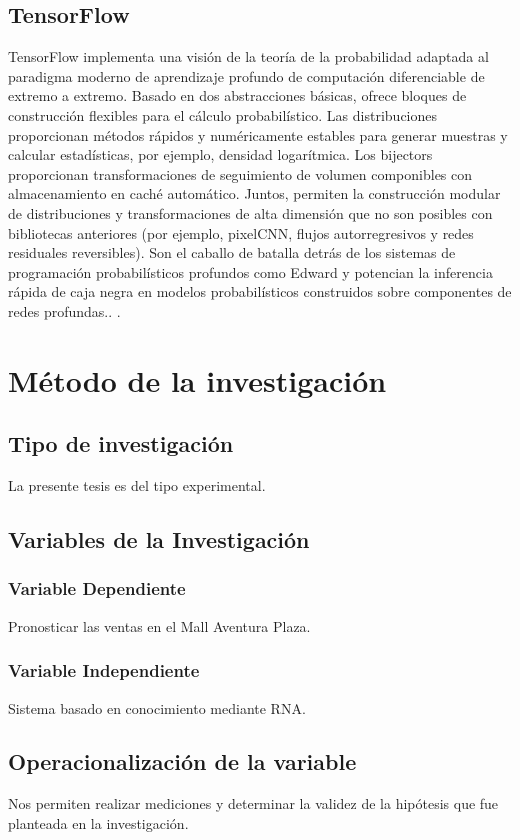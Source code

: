 \subsection{TensorFlow}
TensorFlow implementa una visión de la teoría de la probabilidad adaptada al paradigma moderno de aprendizaje profundo de computación diferenciable de extremo a extremo. Basado en dos abstracciones básicas, ofrece bloques de construcción flexibles para el cálculo probabilístico. Las distribuciones proporcionan métodos rápidos y numéricamente estables para generar muestras y calcular estadísticas, por ejemplo, densidad logarítmica. Los bijectors proporcionan transformaciones de seguimiento de volumen componibles con almacenamiento en caché automático. Juntos, permiten la construcción modular de distribuciones y transformaciones de alta dimensión que no son posibles con bibliotecas anteriores (por ejemplo, pixelCNN, flujos autorregresivos y redes residuales reversibles). Son el caballo de batalla detrás de los sistemas de programación probabilísticos profundos como Edward y potencian la inferencia rápida de caja negra en modelos probabilísticos construidos sobre componentes de redes profundas.. \citep{dillon2017tensorflow}.

\section{Método de la investigación}
\subsection{Tipo de investigación}
La presente tesis es del tipo experimental.

\subsection{Variables de la Investigación}
\subsubsection{Variable Dependiente}
Pronosticar las ventas en el Mall Aventura Plaza.
\subsubsection{Variable Independiente}
Sistema basado en conocimiento mediante RNA.

\subsection{Operacionalización de la variable}
Nos permiten realizar mediciones y determinar la validez de la hipótesis que fue planteada en la investigación. 

